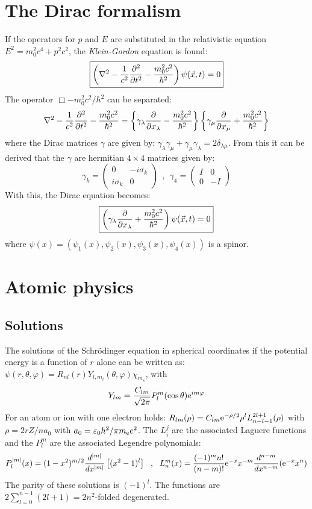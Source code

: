 \section[~~The Dirac formalism]{The Dirac formalism}
If the operators for $p$ and $E$ are substituted in the relativistic equation
$E^2=m_0^2c^4+p^2c^2$, the {\it Klein-Gordon} equation is found:
\[
\mbox{\fbox{$\displaystyle
\left(\nabla^2-\frac{1}{c^2}\frac{\partial^2 }{\partial t^2}-\frac{m_0^2c^2}{\hbar^2}\right)\psi(\vec{x},t)=0
$}}
\]
The operator $\Box-m_0^2c^2/\hbar^2$ can be separated:
\[
\nabla^2-\frac{1}{c^2}\frac{\partial^2 }{\partial t^2}-\frac{m_0^2c^2}{\hbar^2}=
\left\{\gamma_\lambda\frac{\partial }{\partial x_\lambda}-\frac{m_0^2c^2}{\hbar^2}\right\}
\left\{\gamma_\mu\frac{\partial }{\partial x_\mu}+\frac{m_0^2c^2}{\hbar^2}\right\}
\]
where the Dirac matrices $\gamma$ are given by:
$\gamma_\lambda\gamma_\mu+\gamma_\mu\gamma_\lambda=2\delta_{\lambda\mu}$.
From this it can be derived that the $\gamma$ are hermitian $4\times4$
matrices given by:
\[
\gamma_k=\left(\begin{array}{cc}0&-i\sigma_k\\i\sigma_k&0\end{array}\right)~~,~~
\gamma_4=\left(\begin{array}{cc}I&0\\0&-I\end{array}\right)
\]
With this, the Dirac equation becomes:
\[
\mbox{\fbox{$\displaystyle
\left(\gamma_\lambda\frac{\partial }{\partial x_\lambda}+\frac{m_0^2c^2}{\hbar^2}\right)\psi(\vec{x},t)=0
$}}
\]
where $\psi(x)=(\psi_1(x),\psi_2(x),\psi_3(x),\psi_4(x))$ is a spinor.

\section[~~Atomic physics]{Atomic physics}
\subsection[~~Solutions]{Solutions}
The solutions of the Schr\"odinger equation in spherical coordinates if the
potential energy is a function of $r$ alone can be written as:
$\psi(r,\theta,\varphi)=R_{nl}(r)Y_{l,m_l}(\theta,\varphi)\chi_{m_s}$, with
\[
Y_{lm}=\frac{C_{lm}}{\sqrt{2\pi}}P_l^m(\cos\theta){\rm e}^{im\varphi}
\]
For an atom or ion with one electron holds:
$\displaystyle
R_{lm}(\rho)=C_{lm}{\rm e}^{-\rho/2}\rho^l L_{n-l-1}^{2l+1}(\rho)$
\npar
with $\rho=2rZ/na_0$ with $a_0=\varepsilon_0 h^2/\pi m_{\rm e} e^2$. The $L_i^j$ are
the associated Laguere functions and the $P_l^m$ are the associated Legendre
polynomials:
\[
P_l^{|m|}(x)=(1-x^2)^{m/2}\frac{d^{|m|}}{dx^{|m|}}\left[(x^2-1)^l\right]~~,~~
L_n^m(x)=\frac{(-1)^mn!}{(n-m)!}{\rm e}^{-x}x^{-m}\frac{d^{n-m}}{dx^{n-m}}({\rm e}^{-x}x^n)
\]
The parity of these solutions is $(-1)^l$. The functions are
$2\sum\limits_{l=0}^{n-1}(2l+1)=2n^2$-folded degenerated.

